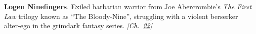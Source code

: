 \textbf{Logen Ninefingers}. Exiled barbarian warrior from Joe Abercrombie's \emph{The First Law} trilogy known as ``The Bloody-Nine'', struggling with a violent berserker alter-ego in the grimdark fantasy series. \emph{[Ch.~\hyperref[ch:minecraftcreeper]{22}]}


